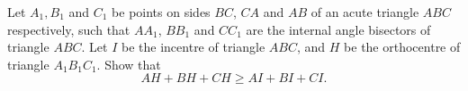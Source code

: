 Let 
$A_1, B_1$
 and 
$C_1$
 be points on sides 
$BC$, 
$CA$
 and 
$AB$
 of an acute triangle 
$ABC$
 respectively, such that 
$AA_1$, 
$BB_1$
 and 
$CC_1$
 are the internal angle bisectors of triangle 
$ABC$. 
 Let 
$I$
 be the incentre of triangle 
$ABC$, 
 and 
$H$
 be the orthocentre of triangle 
$A_1B_1C_1$. 
 Show that 
$$AH + BH + CH \geq AI + BI + CI.$$
